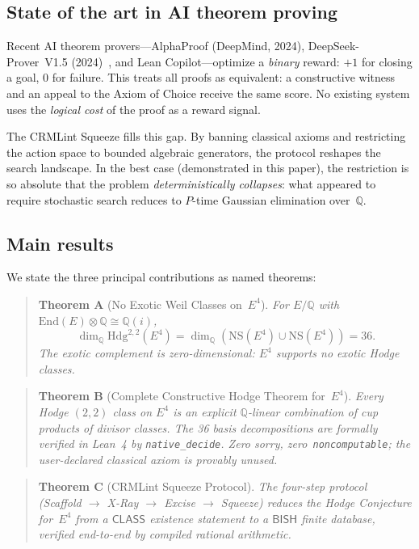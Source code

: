 \documentclass[11pt]{article}
\theoremstyle{plain}
\theoremstyle{definition}
\theoremstyle{remark}
\newcommand{\Q}{\mathbb{Q}}
\newcommand{\End}{\mathrm{End}}
\newcommand{\NS}{\mathrm{NS}}
\newcommand{\Hdg}{\mathrm{Hdg}}
\newcommand{\BISH}{\mathsf{BISH}}
\newcommand{\CLASS}{\mathsf{CLASS}}
\begin{document}
\subsection{State of the art in AI theorem proving}

Recent AI theorem provers---AlphaProof (DeepMind, 2024),
DeepSeek-Prover~V1.5 (2024)~\cite{AlphaProof2024,DeepSeekProver2024},
and Lean Copilot---optimize a
\emph{binary} reward: $+1$ for closing a goal, $0$ for failure.
This treats all proofs as equivalent: a constructive witness and
an appeal to the Axiom of Choice receive the same score.  No
existing system uses the \emph{logical cost} of the proof as a
reward signal.

The CRMLint Squeeze fills this gap.  By banning classical axioms
and restricting the action space to bounded algebraic generators,
the protocol reshapes the search landscape.  In the best case
(demonstrated in this paper), the restriction is so absolute that
the problem \emph{deterministically collapses}: what appeared to
require stochastic search reduces to $P$-time Gaussian elimination
over~$\Q$.

\subsection{Main results}

We state the three principal contributions as named theorems:

\begin{quote}
\textbf{Theorem A} (No Exotic Weil Classes on~$E^4$).
\emph{For $E/\Q$ with $\End(E) \otimes \Q \cong \Q(i)$,
\[
  \dim_\Q \Hdg^{2,2}(E^4) = \dim_\Q (\NS(E^4) \cup \NS(E^4)) = 36.
\]
The exotic complement is zero-dimensional: $E^4$ supports no exotic
Hodge classes.}
\end{quote}

\begin{quote}
\textbf{Theorem B} (Complete Constructive Hodge Theorem for~$E^4$).
\emph{Every Hodge $(2,2)$ class on $E^4$ is an explicit $\Q$-linear
combination of cup products of divisor classes.  The 36 basis
decompositions are formally verified in Lean~4 by
\texttt{native\_decide}.  Zero sorry, zero~\texttt{noncomputable};
the user-declared classical axiom is provably unused.}
\end{quote}

\begin{quote}
\textbf{Theorem C} (CRMLint Squeeze Protocol).
\emph{The four-step protocol (Scaffold $\to$ X-Ray $\to$ Excise
$\to$ Squeeze) reduces the Hodge Conjecture for~$E^4$ from a
$\CLASS$ existence statement to a $\BISH$ finite database, verified
end-to-end by compiled rational arithmetic.}
\end{quote}
\end{document}
